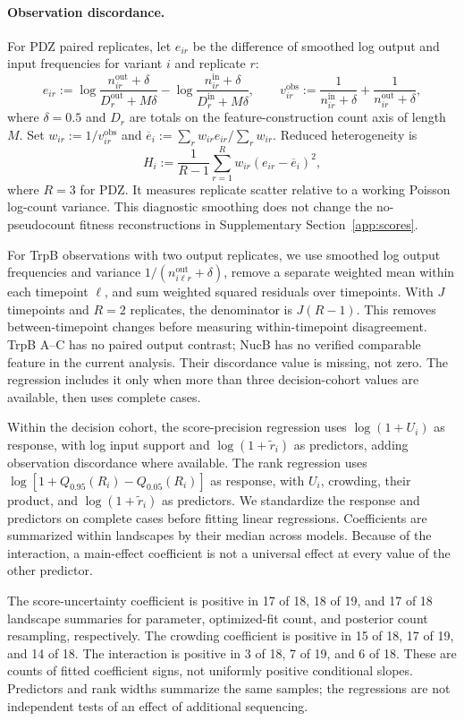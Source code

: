 \paragraph{Observation discordance.}
For PDZ paired replicates, let $e_{ir}$ be the difference of smoothed
log output and input frequencies for variant $i$ and replicate $r$:
\[
e_{ir}:=\log\frac{n_{ir}^{\mathrm{out}}+\delta}
{D_r^{\mathrm{out}}+M\delta}
-\log\frac{n_{ir}^{\mathrm{in}}+\delta}{D_r^{\mathrm{in}}+M\delta},
\qquad
v_{ir}^{\mathrm{obs}}:=\frac{1}{n_{ir}^{\mathrm{in}}+\delta}
+\frac{1}{n_{ir}^{\mathrm{out}}+\delta},
\]
where $\delta=0.5$ and $D_r$ are totals on the feature-construction
count axis of length $M$. Set $w_{ir}:=1/v_{ir}^{\mathrm{obs}}$ and
$\overline e_i:=\sum_rw_{ir}e_{ir}/\sum_rw_{ir}$. Reduced heterogeneity is
\[
H_i:=\frac{1}{R-1}\sum_{r=1}^R w_{ir}(e_{ir}-\overline e_i)^2,
\]
where $R=3$ for PDZ. It measures replicate scatter relative to a working
Poisson log-count variance. This diagnostic smoothing does not change
the no-pseudocount fitness reconstructions in Supplementary
Section~\ref{app:scores}.

For TrpB observations with two output replicates, we use smoothed log
output frequencies and variance $1/(n_{i\ell r}^{\mathrm{out}}+\delta)$,
remove a separate weighted mean within each timepoint $\ell$, and sum
weighted squared residuals over timepoints. With $J$ timepoints and
$R=2$ replicates, the denominator is $J(R-1)$. This removes between-timepoint
changes before measuring within-timepoint disagreement. TrpB A--C has
no paired output contrast; NucB has no verified comparable feature in
the current analysis. Their discordance value is missing, not zero.
The regression includes it only when more than three decision-cohort
values are available, then uses complete cases.

Within the decision cohort, the score-precision regression uses
$\log(1+U_i)$ as response, with log input support and
$\log(1+\widetilde r_i)$ as predictors, adding observation discordance
where available. The rank regression uses
$\log[1+Q_{0.95}(R_i)-Q_{0.05}(R_i)]$ as response, with $U_i$,
crowding, their product, and $\log(1+\widetilde r_i)$ as predictors.
We standardize the response and predictors on complete cases before
fitting linear regressions. Coefficients are summarized within
landscapes by their median across models. Because of the interaction,
a main-effect coefficient is not a universal effect at every value
of the other predictor.

The score-uncertainty coefficient is positive in 17 of 18, 18 of 19,
and 17 of 18 landscape summaries for parameter, optimized-fit count,
and posterior count resampling, respectively. The crowding coefficient
is positive in 15 of 18, 17 of 19, and 14 of 18. The interaction is
positive in 3 of 18, 7 of 19, and 6 of 18. These are counts of fitted
coefficient signs, not uniformly positive conditional slopes. Predictors
and rank widths summarize the same samples; the regressions are not
independent tests of an effect of additional sequencing.

